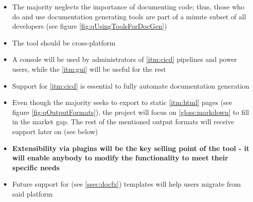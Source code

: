 \begin{itemize}
    \item The majority neglects the importance of documenting code; thus, those who do and use documentation generating tools are part of a minute subset of all developers (see figure \ref{fig:qUsingToolsForDocGen})
    \item The tool should be cross-platform
    \item A console will be used by administrators of \ref{itm:cicd} pipelines and power users, while the \ref{itm:gui} will be useful for the rest
    \item Support for \ref{itm:cicd} is essential to fully automate documentation generation
    \item Even though the majority seeks to export to static \ref{itm:html} pages (see figure \ref{fig:qOutputFormats}), the project will focus on \ref{gloss:markdown} to fill in the market gap. The rest of the mentioned output formats will receive support later on (see below)
    \item \textbf{Extensibility via plugins will be the key selling point of the tool - it will enable anybody to modify the functionality to meet their specific needs}
    \item Future support for  (see \ref{ssec:docfx}) templates will help users migrate from said platform
\end{itemize}